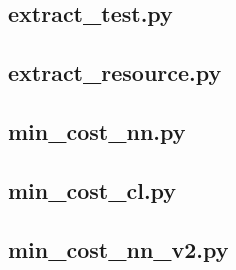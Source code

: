 \documentclass[12pt,a4paper]{article}
\begin{document}
\subsection{extract\_test.py}

\subsection{extract\_resource.py}

\subsection{min\_cost\_nn.py}

\subsection{min\_cost\_cl.py}

\subsection{min\_cost\_nn\_v2.py}

\end{document}
